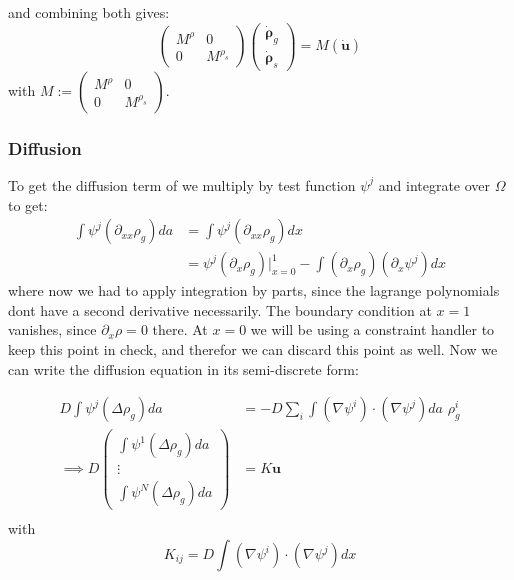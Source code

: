 and combining both gives:
\begin{equation*}
    \begin{pmatrix}
        M^\rho & 0 \\ 0 & M^{\rho_s}
    \end{pmatrix}\begin{pmatrix}
        \dot{\boldsymbol{\rho}}_g \\ \dot{\boldsymbol{\rho}}_s
    \end{pmatrix} = M(\dot{\mathbf{u}})
\end{equation*}
with $M:=\begin{pmatrix}
        M^\rho & 0 \\ 0 & M^{\rho_s}
    \end{pmatrix}$.

\subsubsection*{Diffusion}
To get the diffusion term of we multiply by test function $\psi^j$ and integrate over $\Omega$ to get:
\begin{equation*}
\begin{aligned}
\int \psi^j(\partial_{xx}\rho_g)da &= \int \psi^j(\partial_{xx}\rho_g) dx \\
&= \psi^j(\partial_x\rho_g)\bigg|_{x=0}^1 -\int (\partial_x\rho_g)(\partial_x\psi^j)dx
\end{aligned}
\end{equation*}
where now we had to apply integration by parts, since the lagrange polynomials dont have a second derivative necessarily. The boundary condition at $x=1$ vanishes, since $\partial_x\rho=0$ there. At $x=0$ we will be using a constraint handler to keep this point in check, and therefor we can discard this point as well. Now we can write the diffusion equation in its semi-discrete form:

\begin{equation*}
    \begin{aligned}
        D\int \psi^j(\Delta\rho_g)da &= -D \sum_i \int (\nabla \psi^i)\cdot(\nabla\psi^j)da \,\,\rho_g^i \\
        \implies 
        D\begin{pmatrix}
            \int \psi^1(\Delta\rho_g)da \\
            \vdots \\
            \int \psi^N(\Delta\rho_g)da
        \end{pmatrix}&= K\mathbf{u}\\
    \end{aligned}
\end{equation*}
with
\begin{equation}\label{eq:model_2_diffusion_matrix}
K_{ij}=D\int (\nabla \psi^i)\cdot(\nabla\psi^j)dx
\end{equation}

